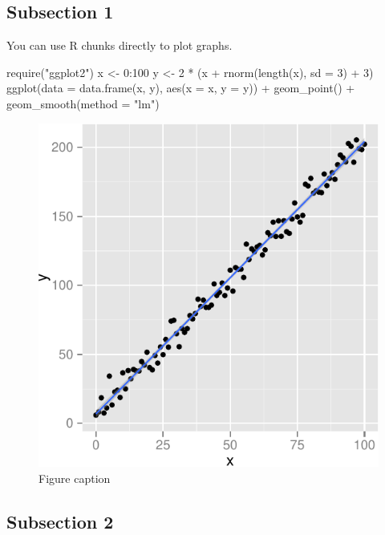 \documentclass[10pt]{article}
\newenvironment{CodeChunk}{}{}
\begin{document}
\subsection*{Subsection 1}\label{subsection-1}

You can use R chunks directly to plot graphs.

\begin{CodeChunk}
\begin{CodeInput}
require("ggplot2")
x <- 0:100
y <- 2 * (x + rnorm(length(x), sd = 3) + 3)
ggplot(data = data.frame(x, y), 
       aes(x = x, y = y)) + 
  geom_point() + 
  geom_smooth(method = "lm")
\end{CodeInput}
\begin{figure}

{\centering \includegraphics{skeleton_files/figure-latex/graph-1} 

}

\caption[Figure caption]{Figure caption}\label{fig:graph}
\end{figure}
\end{CodeChunk}

\subsection*{Subsection 2}\label{subsection-2}
\end{document}
